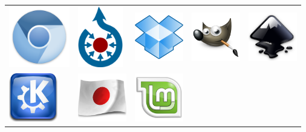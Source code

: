 \noindent
\begin{tabular}{lllll}
\href{http://www.chromium.org/Home}{\includegraphics[height=100px]{img/thanks/chromium.png}} &
\href{http://commons.wikimedia.org/}{\includegraphics[height=100px]{img/thanks/commons.png}} &
\href{https://www.dropbox.com/}{\includegraphics[height=80px]{img/thanks/dropbox.png}} & 
\href{http://www.gimp.org/}{\includegraphics[height=80px]{img/thanks/gimp.png}}&
\href{http://inkscape.org/}{\includegraphics[height=80px]{img/thanks/inkscape.png}} \\

\href{http://www.kde.org/}{\includegraphics[height=80px]{img/thanks/kde.png}} &
\href{http://edu.kde.org/kiten/}{\includegraphics[height=80px]{img/thanks/kiten.png}} &
\href{http://www.linuxmint.com/}{\includegraphics[height=80px]{img/thanks/linuxmint.png}} &


\end{tabular}
